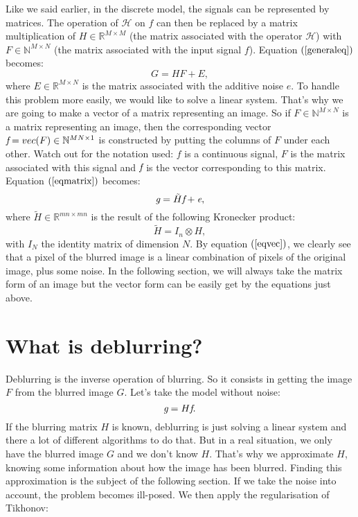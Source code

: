 Like we said earlier, in the discrete model, the signals can be represented by matrices. The operation of $\mathcal{H}$ on $f$ can then be replaced by a matrix multiplication of $H \in \mathbb{R}^{M \times M}$ (the matrix associated with the operator $\mathcal{H}$) with $F \in \mathbb{N}^{M \times N}$ (the matrix associated with the input signal $f$). Equation $(\ref{generaleq})$ becomes:
\begin{equation}
G = HF + E,
\label{eqmatrix}
\end{equation}
where $E \in \mathbb{R}^{M \times N}$ is the matrix associated with the additive noise $e$. To handle this problem more easily, we would like to solve a linear system. That's why we are going to make a vector of a matrix representing an image. So if $F \in \mathbb{N}^{M \times N}$ is a matrix representing an image, then the corresponding vector $\emph{f} = vec(F) \in \mathbb{N}^{MN \times 1}$ is constructed by putting the columns of $F$ under each other. Watch out for the notation used: $f$ is a continuous signal, $F$ is the matrix associated with this signal and $\emph{f}$  is the vector corresponding to this matrix. Equation $(\ref{eqmatrix})$ becomes:
\begin{equation}
\emph{g} = \tilde{H}\emph{f} + \emph{e},
\label{eqvec}
\end{equation}
where $\tilde{H} \in \mathbb{R}^{mn \times mn}$ is the result of the following Kronecker product:
\begin{equation}
\tilde{H} = I_n \otimes H,
\end{equation}
with $I_N$ the identity matrix of dimension $N$. By equation $(\ref{eqvec})$, we clearly see that a pixel of the blurred image is a linear combination of pixels of the original image, plus some noise. In the following section, we will always take the matrix form of an image but the vector form can be easily get by the equations just above.

\section{What is deblurring?}

Deblurring is the inverse operation of blurring. So it consists in getting the image $F$ from the blurred image $G$. Let's take the model without noise:
\begin{equation}
\emph{g}=H\emph{f}.
\end{equation}
If the blurring matrix $H$ is known, deblurring is just solving a linear system and there a lot of different algorithms to do that. But in a real situation, we only have the blurred image $G$ and we don't know $H$. That's why we approximate $H$, knowing some information about how the image has been blurred. Finding this approximation is the subject of the following section. If we take the noise into account, the problem becomes ill-posed. We then apply the regularisation of Tikhonov:

